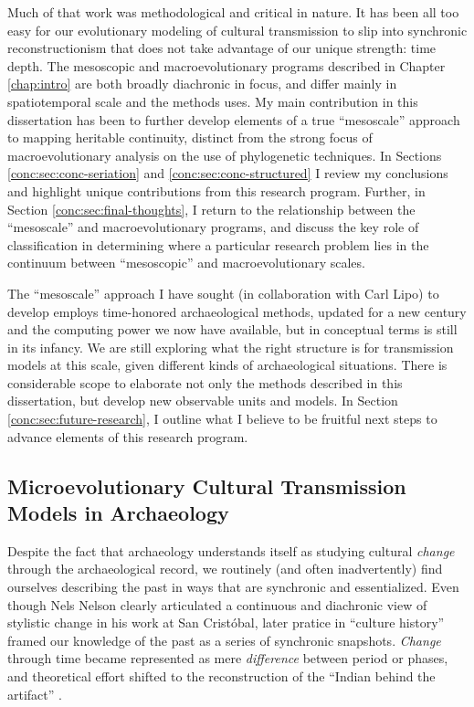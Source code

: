 Much of that work was methodological and critical in nature.  It has been all too easy for our evolutionary modeling of cultural transmission to slip into synchronic reconstructionism that does not take advantage of our unique strength:  time depth.  The mesoscopic and macroevolutionary programs described in Chapter \ref{chap:intro} are both broadly diachronic in focus, and differ mainly in spatiotemporal scale and the methods uses.  My main contribution in this dissertation has been to further develop elements of a true ``mesoscale'' approach to mapping heritable continuity, distinct from the strong focus of macroevolutionary analysis on the use of phylogenetic techniques.  In Sections \ref{conc:sec:conc-seriation} and \ref{conc:sec:conc-structured} I review my conclusions and highlight unique contributions from this research program.  Further, in Section \ref{conc:sec:final-thoughts}, I return to the relationship between the ``mesoscale'' and macroevolutionary programs, and discuss the key role of classification in determining where a particular research problem lies in the continuum between ``mesoscopic'' and macroevolutionary scales. 

The ``mesoscale'' approach I have sought (in collaboration with Carl Lipo) to develop employs time-honored archaeological methods, updated for a new century and the computing power we now have available, but in conceptual terms is still in its infancy.  We are still exploring what the right structure is for transmission models at this scale, given different kinds of archaeological situations.  There is considerable scope to elaborate not only the methods described in this dissertation, but develop new observable units and models.  In Section \ref{conc:sec:future-research}, I outline what I believe to be fruitful next steps to advance elements of this research program.

\subsection{Microevolutionary Cultural Transmission Models in Archaeology}\label{conc:sec:conc-microevolutionary}

Despite the fact that archaeology understands itself as studying cultural \emph{change} through the archaeological record, we routinely (and often inadvertently) find ourselves describing the past in ways that are synchronic and essentialized.  Even though Nels Nelson \citeyearpar{Nelson1916} clearly articulated a continuous and diachronic view of stylistic change in his work at San Crist\'obal, later pratice in ``culture history'' framed our knowledge of the past as a series of synchronic snapshots.  \emph{Change} through time became represented as mere \emph{difference} between period or phases, and theoretical effort shifted to the reconstruction of the ``Indian behind the artifact'' \citep[79]{braidwood1959archeology}.  

